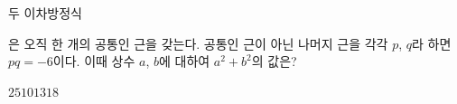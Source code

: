 두 이차방정식 \par\smallskip{}\par\smallskip\noindent 은 오직 한 개의 공통인 근을 갖는다. 공통인 근이 아닌 나머지 근을 각각 $p$, $q$라 하면 $pq=-6$이다. 이때 상수 $a$, $b$에 대하여 $a^2+b^2$의 값은? 
\begin{choices32}{$2$}{$5$}{$10$}{$13$}{$18$}\end{choices32}
